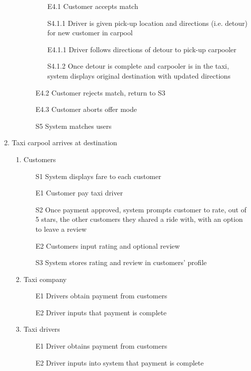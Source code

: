 \documentclass[]{article}
\begin{document}
\begin{enumerate}[{BE}1.]
\begin{enumerate}[{VP4}.1]
\begin{enumerate}
				\begin{enumerate}
					\item[E4.1] Customer accepts match
					\item[S4.1.1] Driver is given pick-up location and directions (i.e. detour) for new customer in carpool
					\item[E4.1.1] Driver follows directions of detour to pick-up carpooler
					\item[S4.1.2] Once detour is complete and carpooler is in the taxi, system displays original destination with updated directions
				\end{enumerate}
				\item[E4.2] Customer rejects match, return to S3
				\item[E4.3] Customer aborts offer mode
				\item[S5] System matches users
			\end{enumerate}
	\end{enumerate}
	\item Taxi carpool arrives at destination
	\begin{enumerate}[{VP5}.1]
		\item Customers
			\begin{enumerate}
				\item[S1] System displays fare to each customer
				\item[E1] Customer pay taxi driver
				\item[S2] Once payment approved, system prompts customer to rate, out of 5 stars,  the other customers they shared a ride with, with an option to leave a review
				\item[E2] Customers input rating and optional review
				\item[S3] System stores rating and review in customers’ profile
			\end{enumerate}
		\item Taxi company
			\begin{enumerate}
				\item[E1] Drivers obtain payment from customers
				\item[E2] Driver inputs that payment is complete
			\end{enumerate}
		\item Taxi drivers
			\begin{enumerate}
				\item[E1] Driver obtains payment from customers
				\item[E2] Driver inputs into system that payment is complete

\end{enumerate}
\end{enumerate}
\end{enumerate}
\end{document}
